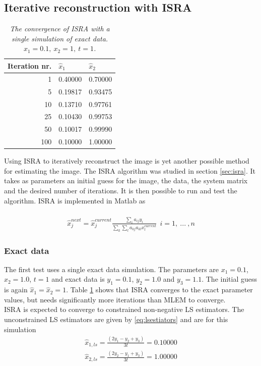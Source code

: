 \documentclass[report,12pt]{report}
\begin{document}
\subsection{Iterative reconstruction with ISRA}
\setlength\intextsep{0pt}
\begin{table}
	\begin{tabular}{|r| l| l|}
		\hline
    	{Iteration nr.}	&${\hat x_1}$	&${\hat x_2}$\\
    	\hline
1 & 0.40000 & 0.70000\\ 
5 & 0.19817 & 0.93475\\ 
10 & 0.13710 & 0.97761\\ 
25 & 0.10430 & 0.99753\\ 
50 & 0.10017 & 0.99990\\ 
100 & 0.10000 & 1.00000\\ 
    	\hline
	\end{tabular}
	\caption{\emph{The convergence of ISRA with a single simulation of exact data. $x_1 = 0.1,\ x_2 = 1,\ t=1$.}}
    \label{tab:israExact}
\end{table}
Using ISRA to iteratively reconstruct the image is yet another possible method for estimating the image. The ISRA algorithm was studied in section \ref{sec:isra}. It takes as parameters an initial guess for the image, the data, the system matrix and the desired number of iterations. It is then possible to run and test the algorithm. ISRA is implemented in Matlab as\\ \\
\begin{align}
	\hat x_j^{next} = \hat x_j^{current}\frac
	{\sum_{i} a_{ij}y_i}
	{\sum_{k} \sum_{l} a_{kj}a_{kl}x_l^{current}}\ \  i = 1,\ ...\ ,n
\end{align}






\subsubsection*{Exact data}
The first test uses a single exact data simulation. The parameters are $x_1 = 0.1$, $x_2 = 1.0$, $t = 1$ and exact data is $y_1 = 0.1$, $y_2 = 1.0$ and $y_3 = 1.1$. The initial guess is again $\hat x_1 = \hat x_2 = 1$. Table \ref{tab:israExact} shows that ISRA converges to the exact parameter values, but needs significantly more iterations than MLEM to converge.\\

ISRA is expected to converge to constrained non-negative LS estimators. The unconstrained LS estimators are given by \ref{eq:lsestiators} and are for this simulation
\begin{align}
	\hat x_{1, ls} = \frac{(2 y_1 - y_2 + y_3)}{3t} = 0.10000\nonumber\\
	\hat x_{2, ls } = \frac{(2 y_2 - y_1 + y_3)}{3t} = 1.00000\nonumber
\end{align}
\end{document}
